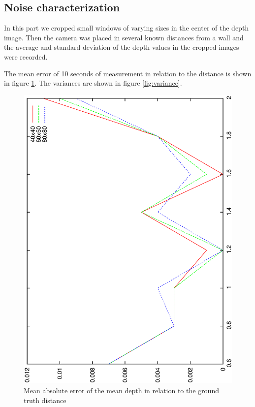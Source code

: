 \documentclass[DIV12,a4paper]{scrartcl}
\begin{document}
\subsection{Noise characterization}
\label{sec:noise_characterization}
In this part we cropped small windows of varying sizes in the center of the depth image. Then the camera was placed in several known distances from a wall and the average and standard deviation of the depth values in the cropped images were recorded.\par
The mean error of 10 seconds of measurement in relation to the distance is shown in figure \ref{fig:mean_error}. The variances are shown in figure \ref{fig:variance}.\par
\begin{figure}[!htbp]
  \centering
  \includegraphics[height=0.8\textwidth,angle=270]{figures/distance_values.eps}
  \caption{Mean absolute error of the mean depth in relation to the ground truth distance}
  \label{fig:mean_error}
\end{figure}
\end{document}
